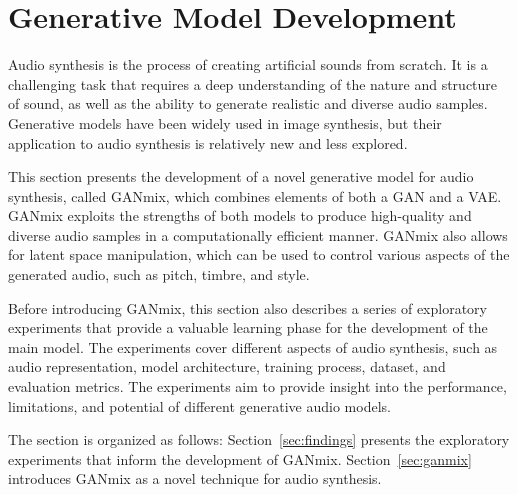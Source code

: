 \section{Generative Model Development} \label{sec:sol-models}

Audio synthesis is the process of creating artificial sounds from scratch. It is a challenging task that requires a deep understanding of the nature and structure of sound, as well as the ability to generate realistic and diverse audio samples. Generative models have been widely used in image synthesis, but their application to audio synthesis is relatively new and less explored.

This section presents the development of a novel generative model for audio synthesis, called GANmix, which combines elements of both a \ac{GAN} and a \ac{VAE}. GANmix exploits the strengths of both models to produce high-quality and diverse audio samples in a computationally efficient manner. GANmix also allows for latent space manipulation, which can be used to control various aspects of the generated audio, such as pitch, timbre, and style.

Before introducing GANmix, this section also describes a series of exploratory experiments that provide a valuable learning phase for the development of the main model. The experiments cover different aspects of audio synthesis, such as audio representation, model architecture, training process, dataset, and evaluation metrics. The experiments aim to provide insight into the performance, limitations, and potential of different generative audio models.

The section is organized as follows: Section~\ref{sec:findings} presents the exploratory experiments that inform the development of GANmix. Section~\ref{sec:ganmix} introduces GANmix as a novel technique for audio synthesis. 


